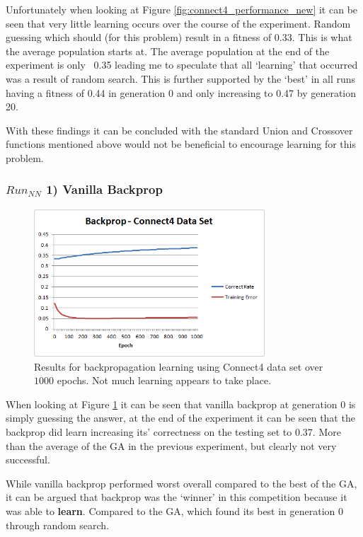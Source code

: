 \documentclass[journal]{IEEEtran}
\begin{document}
      Unfortunately when looking at Figure \ref{fig:connect4_performance_new} it can be seen
    that very little learning occurs over the course of the experiment. Random guessing
    which should (for this problem) result in a fitness of 0.33. This is what the average
    population starts at. The average population at the end of the experiment is only ~0.35
    leading me to speculate that all `learning' that occurred was a result of random search.
    This is further supported by the `best' in all runs having a fitness of 0.44 in generation 0 and only
    increasing to 0.47 by generation 20.

    With these findings it can be concluded with the standard Union and Crossover functions
    mentioned above would not be beneficial to encourage learning for this problem.

    \subsubsection*{$Run_{NN}$ 1) Vanilla Backprop}
      \begin{figure}[here]%
        \centering
        \includegraphics[width=3.4in]{brain_connect4}
        \caption{Results for backpropagation learning using Connect4 data set over $1000$ epochs. Not much learning
        appears to take place.}
        \label{fig:brain_connect4}
      \end{figure}
    When looking at Figure \ref{fig:brain_connect4} it can be seen that vanilla backprop
    at generation 0 is simply guessing the answer, at the end of the experiment it can be
    seen that the backprop did learn increasing its' correctness on the testing set to 0.37.
    More than the average of the GA in the previous experiment, but clearly not very successful.

    While vanilla backprop performed worst overall compared to the best of the GA, it can be argued that
    backprop was the `winner' in this competition because it was able to \textbf{learn}. Compared to
    the GA, which found its best in generation 0 through random search.
\end{document}
